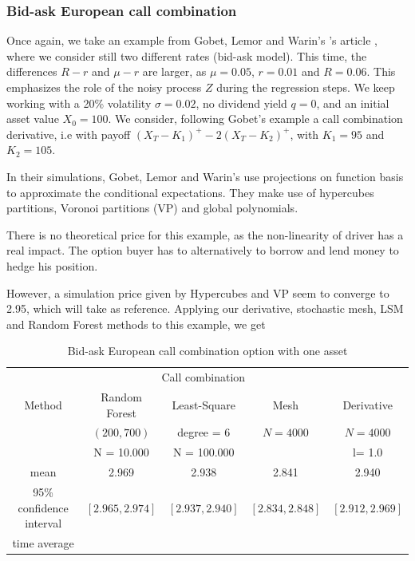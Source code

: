 \documentclass[english,11pt,openany]{article}
\theoremstyle{definition}
\theoremstyle{plain}
\theoremstyle{definition}
\begin{document}
	
	\subsubsection{Bid-ask European call combination}
	
	Once again, we take an example from Gobet, Lemor and Warin's 's article \cite{gobet:example}, where we consider still two different rates (bid-ask model). This time, the differences $R-r$ and $\mu - r$ are larger, as $\mu = 0.05$, $r=0.01$ and $R=0.06$. This emphasizes the role of the noisy process $Z$ during the regression steps. 
	We keep working with a 20\% volatility $\sigma=0.02$, no dividend yield $q=0$, and an initial asset value $X_0 = 100$. We consider, following Gobet's example a call combination derivative, i.e with payoff $(X_T - K_1)^+ - 2(X_T - K_2)^+$, with $K_1 = 95$ and $K_2 = 105$.
	
	In their simulations, Gobet, Lemor and Warin's use projections on function basis to approximate the conditional expectations. They make use of hypercubes partitions, Voronoi partitions (VP) and global polynomials. 
	
	There is no theoretical price for this example, as the non-linearity of driver has a real impact. The option buyer has to alternatively to borrow and lend money to hedge his position.
	
	However, a simulation price given by Hypercubes and VP seem to converge to 2.95, which will take as reference. 
	Applying our derivative, stochastic mesh, LSM and Random Forest methods to this example, we get
	
	\begin{table}[!h]
		\centering
		\caption{Bid-ask European call combination option with one asset}\label{table:bid_ask_call_combi_1D}
		\begin{tabular}{*5c}
			\toprule
			& \multicolumn{3}{c}{Call combination } \\
			\cmidrule(lr){2-5}
			Method & Random Forest  & Least-Square & Mesh & Derivative \\    
			& $(200, 700)$ & degree = $6$     & $N = 4 000$ &  $N = 4 000$ \\
			& N = 10.000 & N = 100.000     &  &  l= 1.0\\
			\midrule
			mean &     2.969   & 2.938  &  2.841  &  2.940 \\ 
			95\% confidence interval &   $[2.965, 2.974]$     &    $[2.937, 2.940]$     & $[2.834, 2.848]$ & $[2.912, 2.969]$  \\
			time average &        &  &  &  \\
			\bottomrule
		\end{tabular}
	\end{table}
	
\end{document}
